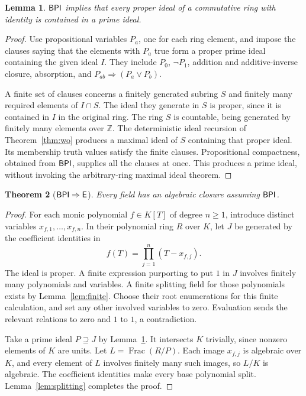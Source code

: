 \documentclass[11pt,a4paper]{article}
\newtheorem{theorem}{Theorem}[section]
\newtheorem{lemma}[theorem]{Lemma}
\theoremstyle{definition}\newtheorem{definition}[theorem]{Definition}
\theoremstyle{remark}\newtheorem{remark}[theorem]{Remark}
\newcommand{\E}{\mathsf E}\newcommand{\U}{\mathsf U}
\DeclareMathOperator{\Frac}{Frac}\DeclareMathOperator{\Fix}{Fix}
\begin{document}
\begin{lemma}\label{lem:ringprime}
$\mathsf{BPI}$ implies that every proper ideal of a commutative ring with identity is contained in a prime ideal.
\end{lemma}
\begin{proof}
Use propositional variables $P_a$, one for each ring element, and impose the clauses saying that the elements with $P_a$ true form a proper prime ideal containing the given ideal $I$. They include $P_0$, $\neg P_1$, addition and additive-inverse closure, absorption, and $P_{ab}\Rightarrow(P_a\vee P_b)$.

A finite set of clauses concerns a finitely generated subring $S$ and finitely many required elements of $I\cap S$. The ideal they generate in $S$ is proper, since it is contained in $I$ in the original ring. The ring $S$ is countable, being generated by finitely many elements over $\mathbb Z$. The deterministic ideal recursion of Theorem~\ref{thm:wo} produces a maximal ideal of $S$ containing that proper ideal. Its membership truth values satisfy the finite clauses. Propositional compactness, obtained from $\mathsf{BPI}$, supplies all the clauses at once. This produces a prime ideal, without invoking the arbitrary-ring maximal ideal theorem.
\end{proof}

\begin{theorem}[$\BPI\Rightarrow\E$]\label{thm:bpie}
Every field has an algebraic closure assuming $\mathsf{BPI}$.
\end{theorem}
\begin{proof}
For each monic polynomial $f\in K[T]$ of degree $n\geq1$, introduce distinct variables $x_{f,1},\ldots,x_{f,n}$. In their polynomial ring $R$ over $K$, let $J$ be generated by the coefficient identities in
\[
f(T)=\prod_{j=1}^{n}(T-x_{f,j}).
\]
The ideal is proper. A finite expression purporting to put $1$ in $J$ involves finitely many polynomials and variables. A finite splitting field for those polynomials exists by Lemma~\ref{lem:finite}. Choose their root enumerations for this finite calculation, and set any other involved variables to zero. Evaluation sends the relevant relations to zero and $1$ to $1$, a contradiction.

Take a prime ideal $P\supseteq J$ by Lemma~\ref{lem:ringprime}. It intersects $K$ trivially, since nonzero elements of $K$ are units. Let $L=\Frac(R/P)$. Each image $x_{f,j}$ is algebraic over $K$, and every element of $L$ involves finitely many such images, so $L/K$ is algebraic. The coefficient identities make every base polynomial split. Lemma~\ref{lem:splitting} completes the proof.
\end{proof}
\end{document}
